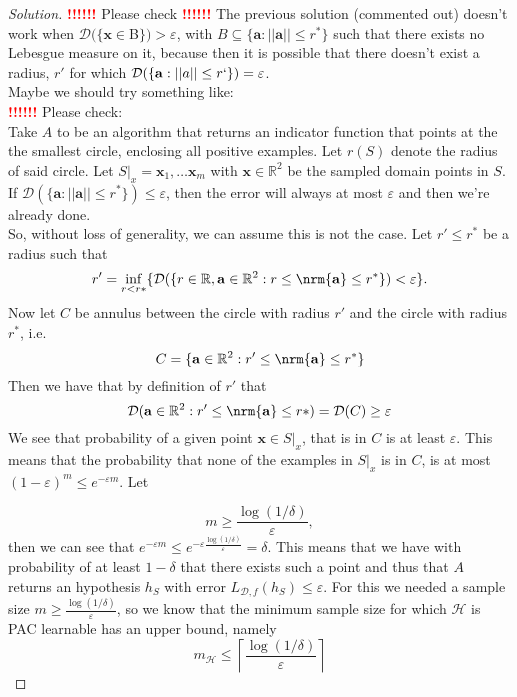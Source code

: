 \documentclass[10pt, a4paper, twoside]{amsart}
\newcommand{\R}{\ensuremath{\mathbb{R}}}
\DeclarePairedDelimiter{\nrm}\lVert\rVert
\newenvironment{solution}
               {\let\oldqedsymbol=\qedsymbol
                \renewcommand{\qedsymbol}{$\blacktriangleleft$}
                \begin{proof}[Solution]}
               {\end{proof}
                \renewcommand{\qedsymbol}{\oldqedsymbol}}
\newcommand{\TODO}{\textcolor{red}{\textbf{!!!!!! }}}
\begin{document}
\begin{solution}
    \TODO Please check \TODO
  The previous solution (commented out) doesn't work when $\mathcal{D}(\{\mathbf{x}\in $B$\})> \varepsilon$, with $B \subseteq \{\mathbf{a}: ||\mathbf{a}|| \leq r^*\}$ such that there exists no Lebesgue measure on it, because then it is possible that there doesn't exist a radius, $r'$ for which $\mathcal{D}(\{\mathbf{a}: ||a|| \leq r`\})=\varepsilon$. \\
  Maybe we should try something like: \\
  \TODO Please check: \\
  Take $A$ to be an algorithm that returns an indicator function that points at the the smallest circle, enclosing all positive examples. Let $r(S)$ denote the radius of said circle.
  Let $S|_x  = \mathbf{x}_1,\ldots \mathbf{x}_m$ with $\mathbf{x} \in \R^2$ be the sampled domain points in $S$. 
  If $\mathcal{D}(\{\mathbf{a}:||\mathbf{a}||\leq r^{*}\}) \leq \varepsilon $, 
  then the error will always at most $\varepsilon$ and then we're already done.\\
  So, without loss of generality, we can assume this is not the case.
  Let $r' \leq r^*$ be a radius such that
  \begin{equation*}
   r' = \inf_{r<r*} \{\mathcal{D}(\{r \in \R, \mathbf{a} \in \R^2: r \leq \nrm{\mathbf{a}} \leq r^*\}) < \varepsilon \}.
  \end{equation*}
  Now let $C$ be annulus between the circle with radius $r'$ and the circle with radius $r^*$, i.e.
  \begin{equation*}
    C = \{\mathbf{a} \in \R^2: r' \leq \nrm{\mathbf{a}} \leq r^* \}
  \end{equation*}
  Then we have that by definition of $r'$ that
  \begin{equation*}
    \mathcal{D}(\mathbf{a} \in \R^2: r' \leq \nrm{\mathbf{a}}\leq r*) = \mathcal{D}(C) \geq \varepsilon
  \end{equation*}
  We see that probability of a given point $\mathbf{x} \in S|_x$, that is in $C$ is at least $\varepsilon$. This means that the probability that none of the examples in $S|_x$ is in $C$, is at most $(1-\varepsilon)^m \leq e^{-\varepsilon m}$. Let

\begin{equation*}
  m \geq \frac{\log(1/\delta)}{\varepsilon},
\end{equation*}
then we can see that $e^{-\varepsilon m} \leq e^{-\varepsilon \frac{\log(1/\delta)}{\varepsilon}} = \delta$. This means that we have with probability of at least $1- \delta$ that there exists such a point and thus that $A$ returns an hypothesis $h_S$ with error $L_{\mathcal{D},f}(h_S) \leq \varepsilon$. For this we needed a sample size $m \geq \frac{\log(1/\delta)}{\varepsilon}$, so we know that the minimum sample size for which $\mathcal{H}$ is PAC learnable has an upper bound, namely 
  \begin{equation*}
    m_{\mathcal{H}}\leq \left\lceil \frac{\log(1/\delta )}{\varepsilon} \right\rceil
  \end{equation*}
\end{solution}
\end{document}
